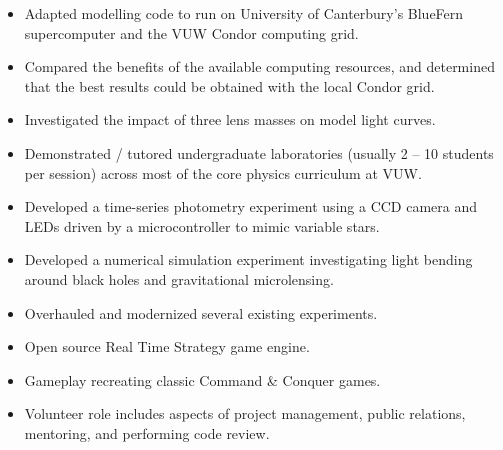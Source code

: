 \documentclass[print]{cv-style}
\begin{document}
\begin{entrylist}
  {
\begin{itemize}
    \item Adapted modelling code to run on University of Canterbury’s BlueFern supercomputer and the VUW Condor computing grid.
    \item Compared the benefits of the available computing resources, and determined that the best results could be obtained with the local Condor grid.
    \item Investigated the impact of three lens masses on model light curves.
  \end{itemize}}
  {
  \begin{itemize}
    \item Demonstrated / tutored undergraduate laboratories (usually 2 -- 10 students per session) across most of the core physics curriculum at VUW.
    \item Developed a time-series photometry experiment using a CCD camera and LEDs driven by a microcontroller to mimic variable stars.
    \item Developed a numerical simulation experiment investigating light bending around black holes and gravitational microlensing.
    \item Overhauled and modernized several existing experiments.
    \end{itemize}}
  {
\begin{itemize}
    \item Open source Real Time Strategy game engine.
    \item Gameplay recreating classic Command \& Conquer games.
    \item Volunteer role includes aspects of project management, public relations, mentoring, and performing code review.
  \end{itemize}}

\end{entrylist}
\end{document}
